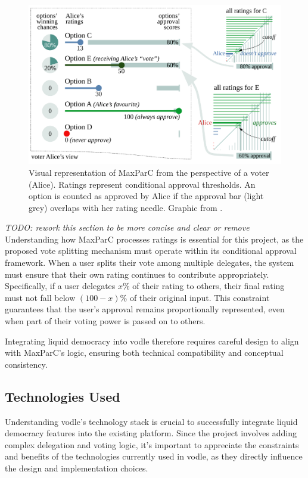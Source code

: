 \begin{figure}[H]
  \centering
  \includegraphics[width=0.8\linewidth]{../common/maxparc.png}
  \caption{Visual representation of MaxParC from the perspective of a voter (Alice). Ratings represent conditional approval thresholds. An option is counted as approved by Alice if the approval bar (light grey) overlaps with her rating needle. Graphic from \citet{heitzig_fair_2024}.}
\end{figure}

\textit{TODO: rework this section to be more concise and clear or remove}
Understanding how MaxParC processes ratings is essential for this project, as the proposed vote splitting mechanism must operate within its conditional approval framework. When a user splits their vote among multiple delegates, the system must ensure that their own rating continues to contribute appropriately. Specifically, if a user delegates $x\%$ of their rating to others, their final rating must not fall below $(100-x)\%$ of their original input. This constraint guarantees that the user's approval remains proportionally represented, even when part of their voting power is passed on to others.

Integrating liquid democracy into vodle therefore requires careful design to align with MaxParC's logic, ensuring both technical compatibility and conceptual consistency.

\subsection{Technologies Used}
Understanding vodle's technology stack is crucial to successfully integrate liquid democracy features into the existing platform. Since the project involves adding complex delegation and voting logic, it's important to appreciate the constraints and benefits of the technologies currently used in vodle, as they directly influence the design and implementation choices.

